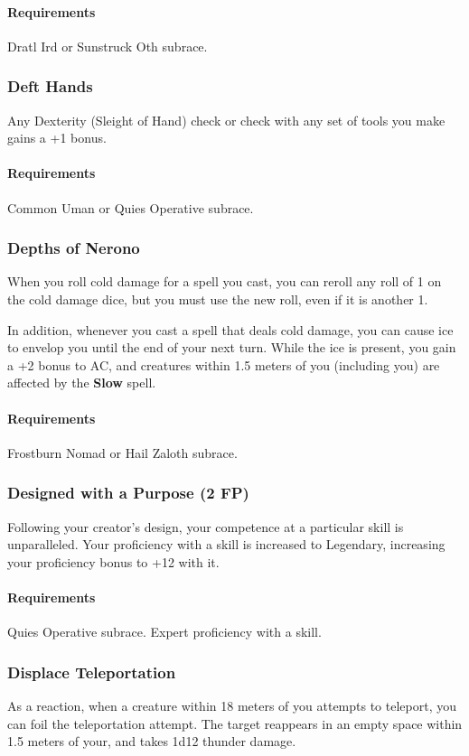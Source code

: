     \paragraph{Requirements} Dratl Ird or Sunstruck Oth subrace.
\subsubsection{Deft Hands} \label{feat::defthands}
    Any Dexterity (Sleight of Hand) check or check with any set of tools you make gains a +1 bonus.
    \paragraph{Requirements} Common Uman or Quies Operative subrace.
\subsubsection{Depths of Nerono} \label{feat::depthsofnerono}
    When you roll cold damage for a spell you cast, you can reroll any roll of 1 on the cold damage dice, but you must use the new roll, even if it is another 1.

    In addition, whenever you cast a spell that deals cold damage, you can cause ice to envelop you until the end of your next turn.
    While the ice is present, you gain a +2 bonus to AC, and creatures within 1.5 meters of you (including you) are affected by the \textbf{Slow} spell.
    \paragraph{Requirements} Frostburn Nomad or Hail Zaloth subrace.
\subsubsection{Designed with a Purpose (2 FP)} \label{feat::designedwithapurpose}
    Following your creator's design, your competence at a particular skill is unparalleled.
    Your proficiency with a skill is increased to Legendary, increasing your proficiency bonus to +12 with it.
    \paragraph{Requirements} Quies Operative subrace. Expert proficiency with a skill.
\subsubsection{Displace Teleportation} \label{feat::displaceteleportation}
    As a reaction, when a creature within 18 meters of you attempts to teleport, you can foil the teleportation attempt.
    The target reappears in an empty space within 1.5 meters of your, and takes 1d12 thunder damage.
